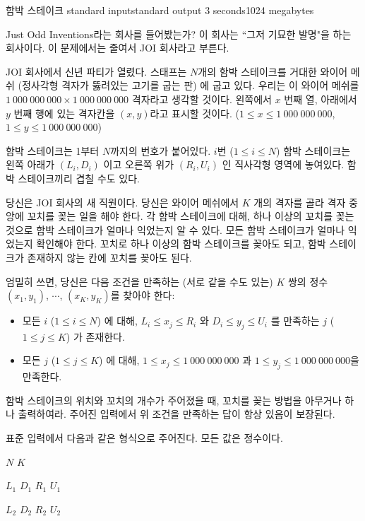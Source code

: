 \begin{problem}{함박 스테이크}
	{standard input}{standard output}
	{3 seconds}{1024 megabytes}{}
	
	Just Odd Inventions라는 회사를 들어봤는가? 이 회사는 ``그저 기묘한 발명"을 하는 회사이다. 이 문제에서는 줄여서 JOI 회사라고 부른다.
	 
	JOI 회사에서 신년 파티가 열렸다. 스태프는 $N$개의 함박 스테이크를 거대한 와이어 메쉬 (정사각형 격자가 뚫려있는 고기를 굽는 판) 에 굽고 있다. 우리는 이 와이어 메쉬를 $1\ 000\ 000\ 000 \times 1\ 000\ 000\ 000$ 격자라고 생각할 것이다. 왼쪽에서 $x$ 번째 열, 아래에서 $y$ 번째 행에 있는 격자칸을 $(x, y)$라고 표시할 것이다. ($1 \le x \le 1\ 000\ 000\ 000$, $1 \le y \le 1\ 000\ 000\ 000$)
	
	함박 스테이크는 1부터 $N$까지의 번호가 붙어있다. $i$번 ($1 \le i \le N$) 함박 스테이크는 왼쪽 아래가 $(L_i, D_i)$ 이고 오른쪽 위가 $(R_i, U_i)$ 인 직사각형 영역에 놓여있다. 함박 스테이크끼리 겹칠 수도 있다.
	
	당신은 JOI 회사의 새 직원이다. 당신은 와이어 메쉬에서 $K$ 개의 격자를 골라 격자 중앙에 꼬치를 꽂는 일을 해야 한다. 각 함박 스테이크에 대해, 하나 이상의 꼬치를 꽂는 것으로 함박 스테이크가 얼마나 익었는지 알 수 있다. 모든 함박 스테이크가 얼마나 익었는지 확인해야 한다. 꼬치로 하나 이상의 함박 스테이크를 꽂아도 되고, 함박 스테이크가 존재하지 않는 칸에 꼬치를 꽂아도 된다.
	
	엄밀히 쓰면, 당신은 다음 조건을 만족하는 (서로 같을 수도 있는) $K$ 쌍의 정수 $(x_1, y_1)$, $\cdots$, $(x_K, y_K)$를 찾아야 한다:
	
	\begin{itemize}
		\item 모든 $i$ ($1 \le i \le N$) 에 대해, $L_i \le x_j \le R_i$ 와 $D_i \le y_j \le U_i$ 를 만족하는 $j$ ($1 \le j \le K$) 가 존재한다.
		\item 모든 $j$ ($1 \le j \le K$) 에 대해, $1 \le x_j \le 1\ 000\ 000\ 000$ 과 $1 \le y_j \le 1\ 000\ 000\ 000$을 만족한다.
	\end{itemize}

	함박 스테이크의 위치와 꼬치의 개수가 주어졌을 때, 꼬치를 꽂는 방법을 아무거나 하나 출력하여라. 주어진 입력에서 위 조건을 만족하는 답이 항상 있음이 보장된다.

	
\InputFile

표준 입력에서 다음과 같은 형식으로 주어진다. 모든 값은 정수이다.

$N$ $K$

$L_1$ $D_1$ $R_1$ $U_1$

$L_2$ $D_2$ $R_2$ $U_2$


\end{problem}
